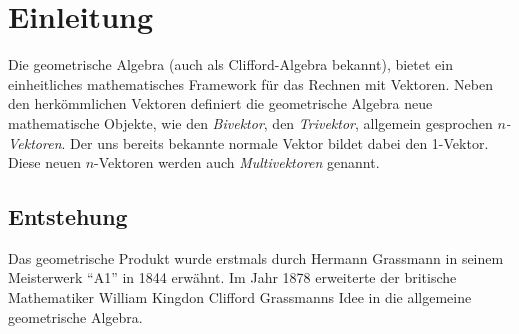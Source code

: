 %
%
%
%
\section{Einleitung\label{geoalgebra:section:einfuehrung}}
Die geometrische Algebra (auch als Clifford-Algebra bekannt), bietet ein einheitliches mathematisches
Framework für das Rechnen mit Vektoren.
Neben den herkömmlichen Vektoren definiert die geometrische
Algebra neue mathematische Objekte, wie den \emph{Bivektor}, den \emph{Trivektor}, allgemein gesprochen
\emph{$n$-Vektoren}.
Der uns bereits bekannte normale Vektor bildet dabei den 1-Vektor. Diese neuen $n$-Vektoren werden auch
\emph{Multivektoren} genannt.

\subsection{Entstehung}
Das geometrische Produkt wurde erstmals durch Hermann Grassmann in seinem Meisterwerk ``A1'' \cite{geoalgebra:grassmann1844lineale} in 1844
erwähnt. Im Jahr 1878 erweiterte der britische Mathematiker William Kingdon Clifford Grassmanns Idee
in die allgemeine geometrische Algebra. 

